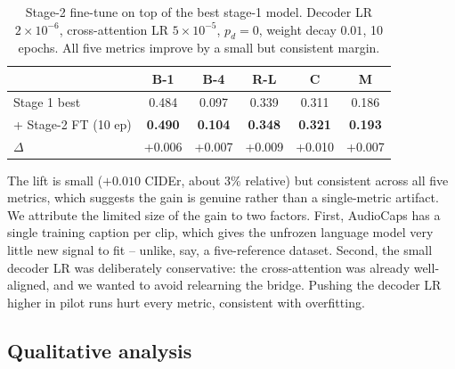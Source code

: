 \documentclass[10pt,twocolumn,letterpaper]{article}
\begin{document}
\begin{table}[t]
\centering\small
\setlength{\tabcolsep}{4pt}
\begin{tabular}{lccccc}
\toprule
 & \textbf{B-1} & \textbf{B-4} & \textbf{R-L} & \textbf{C} & \textbf{M} \\
\midrule
Stage 1 best   & 0.484 & 0.097 & 0.339 & 0.311 & 0.186 \\
+ Stage-2 FT (10 ep) & \textbf{0.490} & \textbf{0.104} & \textbf{0.348} & \textbf{0.321} & \textbf{0.193} \\
\midrule
$\Delta$ & +0.006 & +0.007 & +0.009 & +0.010 & +0.007 \\
\bottomrule
\end{tabular}
\caption{Stage-2 fine-tune on top of the best stage-1 model. Decoder LR
$2\!\times\!10^{-6}$, cross-attention LR $5\!\times\!10^{-5}$, $p_d=0$,
weight decay $0.01$, 10 epochs. All five metrics improve by a small but
consistent margin.}
\label{tab:ft}
\end{table}

The lift is small ($+0.010$ CIDEr, about $3\%$ relative) but consistent across
all five metrics, which suggests the gain is genuine rather than a single-metric
artifact. We attribute the limited size of the gain to two factors. First,
AudioCaps has a single training caption per clip, which gives the unfrozen
language model very little new signal to fit -- unlike, say, a five-reference
dataset. Second, the small decoder LR was deliberately conservative: the
cross-attention was already well-aligned, and we wanted to avoid relearning
the bridge. Pushing the decoder LR higher in pilot runs hurt every metric,
consistent with overfitting.

\subsection{Qualitative analysis}
\end{document}
